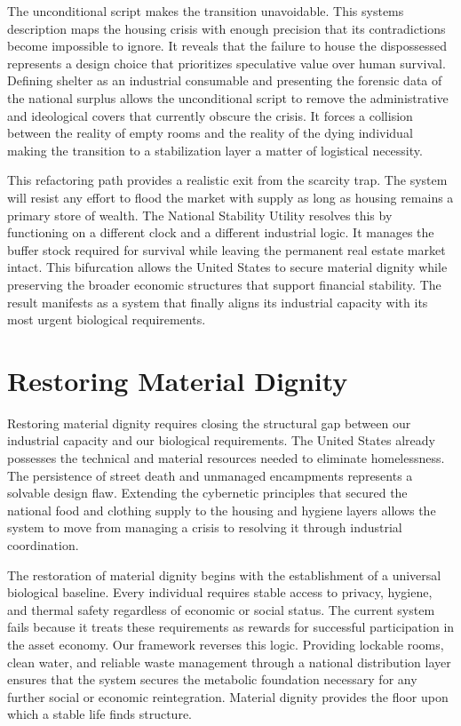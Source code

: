 \documentclass[12pt, letterpaper]{article}
\begin{document}
The unconditional script makes the transition unavoidable. This systems description maps the housing crisis with enough precision that its contradictions become impossible to ignore. It reveals that the failure to house the dispossessed represents a design choice that prioritizes speculative value over human survival. Defining shelter as an industrial consumable and presenting the forensic data of the national surplus allows the unconditional script to remove the administrative and ideological covers that currently obscure the crisis. It forces a collision between the reality of empty rooms and the reality of the dying individual making the transition to a stabilization layer a matter of logistical necessity.

This refactoring path provides a realistic exit from the scarcity trap. The system will resist any effort to flood the market with supply as long as housing remains a primary store of wealth. The National Stability Utility resolves this by functioning on a different clock and a different industrial logic. It manages the buffer stock required for survival while leaving the permanent real estate market intact. This bifurcation allows the United States to secure material dignity while preserving the broader economic structures that support financial stability. The result manifests as a system that finally aligns its industrial capacity with its most urgent biological requirements.

\section{Restoring Material Dignity}

Restoring material dignity requires closing the structural gap between our industrial capacity and our biological requirements. The United States already possesses the technical and material resources needed to eliminate homelessness. The persistence of street death and unmanaged encampments represents a solvable design flaw. Extending the cybernetic principles that secured the national food and clothing supply to the housing and hygiene layers allows the system to move from managing a crisis to resolving it through industrial coordination.

The restoration of material dignity begins with the establishment of a universal biological baseline. Every individual requires stable access to privacy, hygiene, and thermal safety regardless of economic or social status. The current system fails because it treats these requirements as rewards for successful participation in the asset economy. Our framework reverses this logic. Providing lockable rooms, clean water, and reliable waste management through a national distribution layer ensures that the system secures the metabolic foundation necessary for any further social or economic reintegration. Material dignity provides the floor upon which a stable life finds structure.
\end{document}
